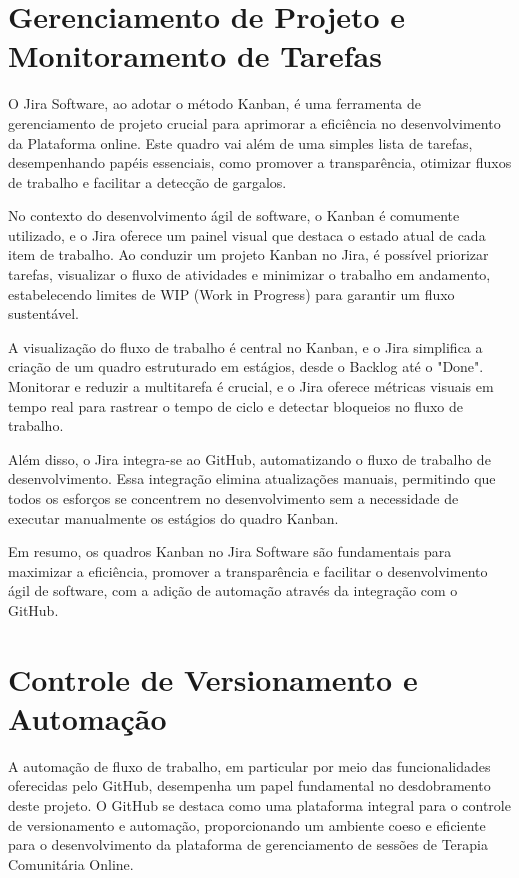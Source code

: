 \section{Gerenciamento de Projeto e Monitoramento de Tarefas}

O Jira Software, ao adotar o método Kanban, é uma ferramenta de gerenciamento de projeto crucial para aprimorar a eficiência no desenvolvimento da Plataforma online. Este quadro vai além de uma simples lista de tarefas, desempenhando papéis essenciais, como promover a transparência, otimizar fluxos de trabalho e facilitar a detecção de gargalos.

No contexto do desenvolvimento ágil de software, o Kanban é comumente utilizado, e o Jira oferece um painel visual que destaca o estado atual de cada item de trabalho. Ao conduzir um projeto Kanban no Jira, é possível priorizar tarefas, visualizar o fluxo de atividades e minimizar o trabalho em andamento, estabelecendo limites de WIP (Work in Progress) para garantir um fluxo sustentável.

A visualização do fluxo de trabalho é central no Kanban, e o Jira simplifica a criação de um quadro estruturado em estágios, desde o Backlog até o "Done". Monitorar e reduzir a multitarefa é crucial, e o Jira oferece métricas visuais em tempo real para rastrear o tempo de ciclo e detectar bloqueios no fluxo de trabalho.

Além disso, o Jira integra-se ao GitHub, automatizando o fluxo de trabalho de desenvolvimento. Essa integração elimina atualizações manuais, permitindo que todos os esforços se concentrem no desenvolvimento sem a necessidade de executar manualmente os estágios do quadro Kanban.

Em resumo, os quadros Kanban no Jira Software são fundamentais para maximizar a eficiência, promover a transparência e facilitar o desenvolvimento ágil de software, com a adição de automação através da integração com o GitHub.

\section{Controle de Versionamento e Automação}

A automação de fluxo de trabalho, em particular por meio das funcionalidades oferecidas pelo GitHub, desempenha um papel fundamental no desdobramento deste projeto. O GitHub se destaca como uma plataforma integral para o controle de versionamento e automação, proporcionando um ambiente coeso e eficiente para o desenvolvimento da plataforma de gerenciamento de sessões de Terapia Comunitária Online.

